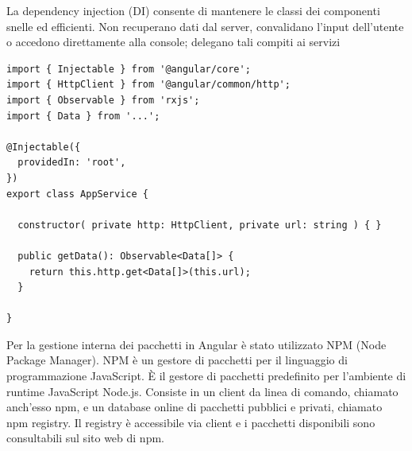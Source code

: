 La dependency injection (DI) consente di mantenere le classi dei componenti snelle ed efficienti. Non recuperano dati dal server, convalidano l'input dell'utente o accedono direttamente alla console; delegano tali compiti ai servizi \cite{ANGULAR} \\
\begin{lstlisting}[caption={Esempio di un Service in Angular}, style=javaScriptCode]
import { Injectable } from '@angular/core';
import { HttpClient } from '@angular/common/http';
import { Observable } from 'rxjs';
import { Data } from '...';

@Injectable({
  providedIn: 'root',
})
export class AppService {

  constructor( private http: HttpClient, private url: string ) { }
  
  public getData(): Observable<Data[]> {
    return this.http.get<Data[]>(this.url);
  }

}
\end{lstlisting}
Per la gestione interna dei pacchetti in Angular è stato utilizzato NPM (Node Package Manager). NPM è un gestore di pacchetti per il linguaggio di programmazione JavaScript. È il gestore di pacchetti predefinito per l'ambiente di runtime JavaScript Node.js. Consiste in un client da linea di comando, chiamato anch'esso npm, e un database online di pacchetti pubblici e privati, chiamato npm registry.
Il registry è accessibile via client e i pacchetti disponibili sono consultabili sul sito web di npm. \cite{NPM}

